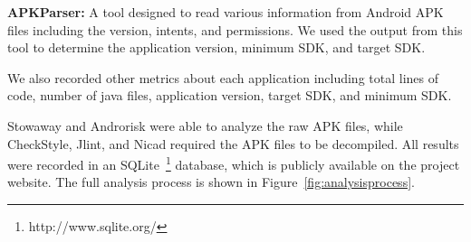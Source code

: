  \textbf{APKParser\cite{apkparser_link}:} A tool designed to read various information from Android APK files including the version, intents, and permissions. We used the output from this tool to determine the application version, minimum SDK, and target SDK.

We also recorded other metrics about each application including total lines of code, number of java files, application version, target SDK, and minimum SDK.



Stowaway and Androrisk were able to analyze the raw APK files, while CheckStyle, Jlint, and Nicad required the APK files to be decompiled. All results were recorded in an SQLite~\footnote{http://www.sqlite.org/} database, which is publicly available on the project website. The full analysis process is shown in Figure~\ref{fig:analysisprocess}.

